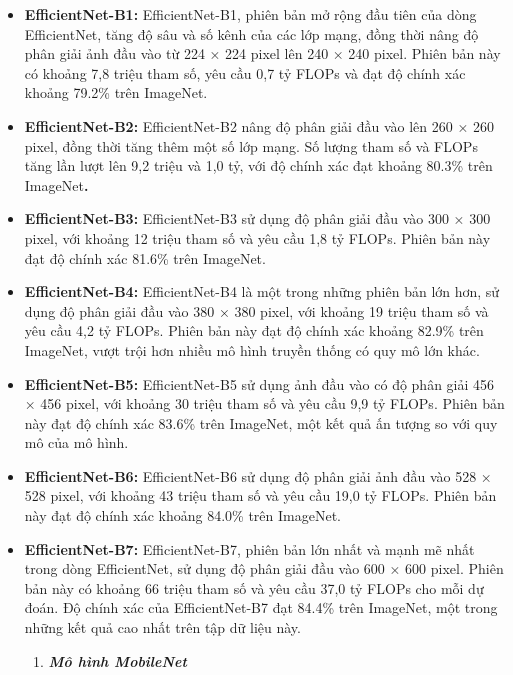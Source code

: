 \documentclass[
]{article}
\begin{document}
\begin{itemize}
\item
  \textbf{EfficientNet-B1:} EfficientNet-B1, phiên bản mở rộng đầu tiên
  của dòng EfficientNet, tăng độ sâu và số kênh của các lớp mạng, đồng
  thời nâng độ phân giải ảnh đầu vào từ 224 × 224 pixel lên 240 × 240
  pixel. Phiên bản này có khoảng 7,8 triệu tham số, yêu cầu 0,7 tỷ FLOPs
  và đạt độ chính xác khoảng 79.2\% trên ImageNet.
\item
  \textbf{EfficientNet-B2:} EfficientNet-B2 nâng độ phân giải đầu vào
  lên 260 × 260 pixel, đồng thời tăng thêm một số lớp mạng. Số lượng
  tham số và FLOPs tăng lần lượt lên 9,2 triệu và 1,0 tỷ, với độ chính
  xác đạt khoảng 80.3\% trên ImageNet\textbf{.}
\item
  \textbf{EfficientNet-B3:} EfficientNet-B3 sử dụng độ phân giải đầu vào
  300 × 300 pixel, với khoảng 12 triệu tham số và yêu cầu 1,8 tỷ FLOPs.
  Phiên bản này đạt độ chính xác 81.6\% trên ImageNet.
\item
  \textbf{EfficientNet-B4:} EfficientNet-B4 là một trong những phiên bản
  lớn hơn, sử dụng độ phân giải đầu vào 380 × 380 pixel, với khoảng 19
  triệu tham số và yêu cầu 4,2 tỷ FLOPs. Phiên bản này đạt độ chính xác
  khoảng 82.9\% trên ImageNet, vượt trội hơn nhiều mô hình truyền thống
  có quy mô lớn khác.
\item
  \textbf{EfficientNet-B5:} EfficientNet-B5 sử dụng ảnh đầu vào có độ
  phân giải 456 × 456 pixel, với khoảng 30 triệu tham số và yêu cầu 9,9
  tỷ FLOPs. Phiên bản này đạt độ chính xác 83.6\% trên ImageNet, một kết
  quả ấn tượng so với quy mô của mô hình.
\item
  \textbf{EfficientNet-B6:} EfficientNet-B6 sử dụng độ phân giải ảnh đầu
  vào 528 × 528 pixel, với khoảng 43 triệu tham số và yêu cầu 19,0 tỷ
  FLOPs. Phiên bản này đạt độ chính xác khoảng 84.0\% trên ImageNet.
\item
  \textbf{EfficientNet-B7:} EfficientNet-B7, phiên bản lớn nhất và mạnh
  mẽ nhất trong dòng EfficientNet, sử dụng độ phân giải đầu vào 600 ×
  600 pixel. Phiên bản này có khoảng 66 triệu tham số và yêu cầu 37,0 tỷ
  FLOPs cho mỗi dự đoán. Độ chính xác của EfficientNet-B7 đạt 84.4\%
  trên ImageNet, một trong những kết quả cao nhất trên tập dữ liệu này.

  \begin{enumerate}
  \def\labelenumi{\arabic{enumi}.}
  \item
    \protect{}\label{_Toc232112021}{}\emph{\textbf{Mô hình
    MobileNet}}
  \end{enumerate}
\end{itemize}
\end{document}
